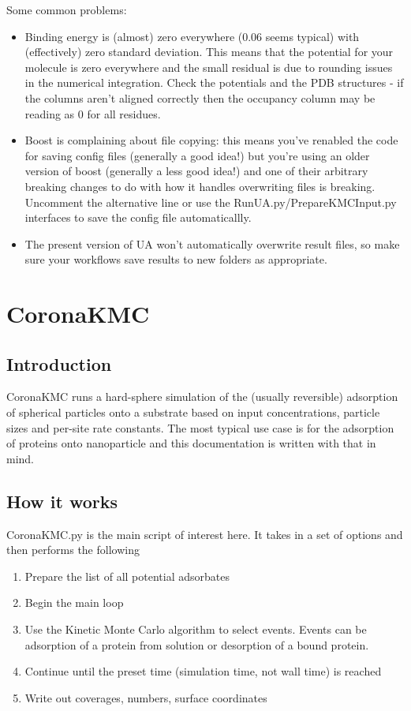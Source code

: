 \documentclass[10pt,a4paper,onecolumn]{report}
\begin{document}
Some common problems:
\begin{itemize}
\item Binding energy is (almost) zero everywhere (0.06 seems typical) with (effectively) zero standard deviation. This means that the potential for your molecule is zero everywhere and the small residual is due to rounding issues in the numerical integration. Check the potentials and the PDB structures - if the columns aren't aligned correctly then the occupancy column may be reading as 0 for all residues.
\item Boost is complaining about file copying: this means you've renabled the code for saving config files (generally a good idea!) but you're using an older version of boost (generally a less good idea!) and one of their arbitrary breaking changes to do with how it handles overwriting files is breaking. Uncomment the alternative line or use the RunUA.py/PrepareKMCInput.py interfaces to save the config file automaticallly. 
\item The present version of UA won't automatically overwrite result files, so make sure your workflows save results to new folders as appropriate.
\end{itemize}


\chapter{CoronaKMC}
 \section{Introduction}
 CoronaKMC runs a hard-sphere simulation of the (usually reversible) adsorption of spherical particles onto a substrate based on input concentrations, particle sizes and per-site rate constants. The most typical use case is for the adsorption of proteins onto nanoparticle and this documentation is written with that in mind. 
 
 \section{How it works}
CoronaKMC.py is the main script of interest here. It takes in a set of options and then performs the following
\begin{enumerate}
\item Prepare the list of all potential adsorbates
\item Begin the main loop
\item Use the Kinetic Monte Carlo algorithm to select events. Events can be adsorption of a protein from solution or desorption of a bound protein.
\item Continue until the preset time (simulation time, not wall time) is reached
\item Write out coverages, numbers, surface coordinates
\end{enumerate} 
 
\end{document}
